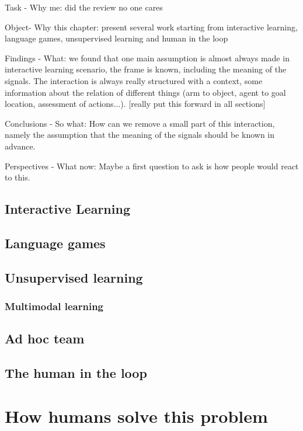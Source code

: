 Task - Why me: did the review no one cares

Object- Why this chapter: present several work starting from interactive learning, language games, unsupervised learning and human in the loop

Findings - What: we found that one main assumption is almost always made in interactive learning scenario, the frame is known, including the meaning of the signals. The interaction is always really structured with a context, some information about the relation of different things (arm to object, agent to goal location, assessment of actions...). [really put this forward in all sections]

Conclusions - So what: How can we remove a small part of this interaction, namely the assumption that the meaning of the signals should be known in advance.

Perspectives - What now: Maybe a first question to ask is how people would react to this.

\section{Interactive Learning}

\section{Language games}

\section{Unsupervised learning}

\subsection{Multimodal learning}

\section{Ad hoc team}

\section{The human in the loop}

\chapter{How humans solve this problem}
\minitoc

